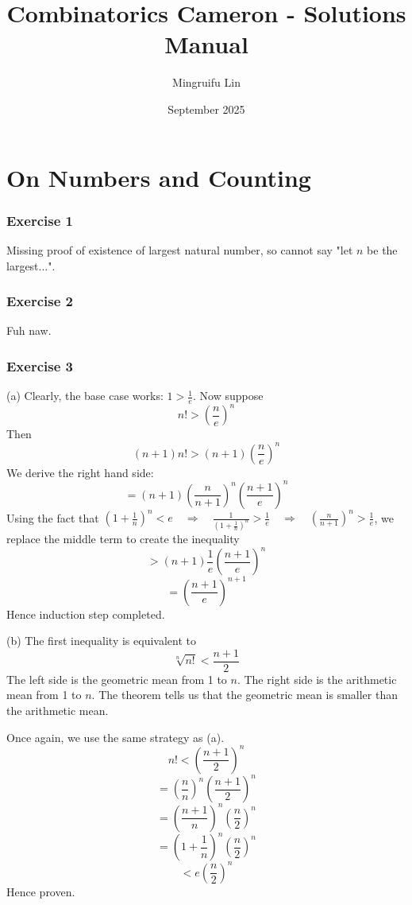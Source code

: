 \documentclass{book}
\title{Combinatorics Cameron - Solutions Manual}
\author{Mingruifu Lin}
\date{September 2025}
\begin{document}
\maketitle

\tableofcontents

\chapter{On Numbers and Counting}

\subsection*{Exercise 1}
Missing proof of existence of largest natural number, so cannot say "let $n$ be the largest...".

\subsection*{Exercise 2}
Fuh naw.

\subsection*{Exercise 3}
(a)
Clearly, the base case works: $1 > \frac{1}{e}$. Now suppose
$$n! > \left(\frac{n}{e}\right)^n$$
Then
$$(n + 1) n! > (n + 1)\left(\frac{n}{e}\right)^{n}$$
We derive the right hand side:
$$= (n + 1)\left(\frac{n}{n + 1}\right)^{n}\left(\frac{n + 1}{e}\right)^{n}$$
Using the fact that $(1 + \frac{1}{n})^n < e \quad \Rightarrow \quad \frac{1}{(1 + \frac{1}{n})^n} > \frac{1}{e} \quad \Rightarrow \quad \left(\frac{n}{n + 1}\right)^n > \frac{1}{e}$, we replace the middle term to create the inequality
$$> (n + 1)\frac{1}{e}\left(\frac{n + 1}{e}\right)^{n}$$
$$= \left(\frac{n + 1}{e}\right)^{n + 1}$$
Hence induction step completed.

\noindent
(b)
The first inequality is equivalent to
$$\sqrt[n]{n!} < \frac{n + 1}{2}$$
The left side is the geometric mean from 1 to $n$. The right side is the arithmetic mean from 1 to $n$. The theorem tells us that the geometric mean is smaller than the arithmetic mean.

Once again, we use the same strategy as (a).
$$n! < \left(\frac{n + 1}{2}\right)^n$$
$$= \left(\frac{n}{n}\right)^n \left(\frac{n + 1}{2}\right)^n$$
$$= \left(\frac{n + 1}{n}\right)^n \left(\frac{n}{2}\right)^n$$
$$= \left(1 + \frac{1}{n}\right)^n \left(\frac{n}{2}\right)^n$$
$$< e \left(\frac{n}{2}\right)^n$$
Hence proven.
\end{document}
